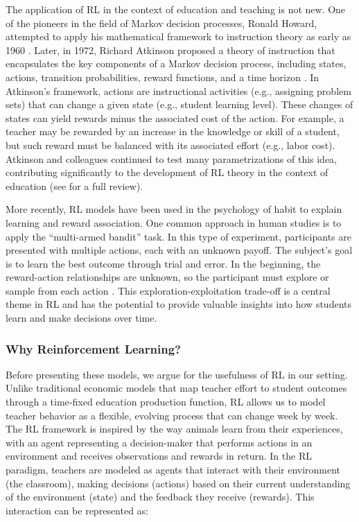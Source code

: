 \documentclass[
  number,
  preprint,
  3p,
  onecolumn]{elsarticle}
\begin{document}
The application of RL in the context of education and teaching is not
new. One of the pioneers in the field of Markov decision processes,
Ronald Howard, attempted to apply his mathematical framework to
instruction theory as early as 1960 \citep{howard1960}. Later, in 1972,
Richard Atkinson proposed a theory of instruction that encapsulates the
key components of a Markov decision process, including states, actions,
transition probabilities, reward functions, and a time horizon
\citep{atkinson1972}. In Atkinson's framework, actions are instructional
activities (e.g., assigning problem sets) that can change a given state
(e.g., student learning level). These changes of states can yield
rewards minus the associated cost of the action. For example, a teacher
may be rewarded by an increase in the knowledge or skill of a student,
but such reward must be balanced with its associated effort (e.g., labor
cost). Atkinson and colleagues continued to test many parametrizations
of this idea, contributing significantly to the development of RL theory
in the context of education (see \citep{doroudi2019} for a full review).

More recently, RL models have been used in the psychology of habit to
explain learning and reward association. One common approach in human
studies is to apply the ``multi-armed bandit'' task. In this type of
experiment, participants are presented with multiple actions, each with
an unknown payoff. The subject's goal is to learn the best outcome
through trial and error. In the beginning, the reward-action
relationships are unknown, so the participant must explore or sample
from each action \citep{sutton2018}. This exploration-exploitation
trade-off is a central theme in RL and has the potential to provide
valuable insights into how students learn and make decisions over time.

\hypertarget{why-reinforcement-learning}{%
\subsubsection{Why Reinforcement
Learning?}\label{why-reinforcement-learning}}

Before presenting these models, we argue for the usefulness of RL in our
setting. Unlike traditional economic models that map teacher effort to
student outcomes through a time-fixed education production function, RL
allows us to model teacher behavior as a flexible, evolving process that
can change week by week. The RL framework is inspired by the way animals
learn from their experiences, with an agent representing a
decision-maker that performs actions in an environment and receives
observations and rewards in return. In the RL paradigm, teachers are
modeled as agents that interact with their environment (the classroom),
making decisions (actions) based on their current understanding of the
environment (state) and the feedback they receive (rewards). This
interaction can be represented as:
\end{document}
